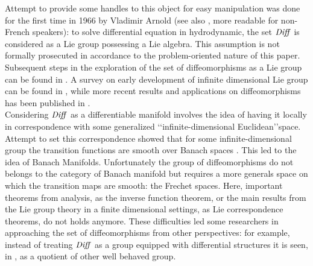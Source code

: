 Attempt to provide some handles to this object for easy manipulation was done for the first time in 1966 by Vladimir Arnold \cite{arnold1966geometrie} (see also \cite{arnold1998topological}, more readable for non-French speakers): to solve differential equation in hydrodynamic, the set $\text{\emph{Diff}}$ is considered as a Lie group possessing a Lie algebra. This assumption is not formally prosecuted in accordance to the problem-oriented nature of this paper. Subsequent steps in the exploration of the set of diffeomorphisms as a Lie group can be found in \cite{marsden1970hamiltonian, ebin1970groups, omori1970group, leslie1983lie}. A survey on early development of infinite dimensional Lie group can be found in \cite{Milnor:84:remarks}, while more recent results and applications on diffeomorphisms has been published in \cite{ovsienko1992integrals, bauer2010sobolev,schmid2010infinite,  bauer2011geodesic}.\\

Considering $\text{\emph{Diff}}$ as a differentiable manifold involves the idea of having it locally in correspondence with some generalized \lq\lq infinite-dimensional Euclidean\rq\rq\phantom{z}space. Attempt to set this correspondence showed that for some infinite-dimensional group the transition functions are smooth over Banach spaces \cite{khesin2008geometry}. This led to the idea of Banach Manifolds. Unfortunately the group of diffeomorphisms do not belongs to the category of Banach manifold but requires a more generals space on which the transition maps are smooth: the Frechet spaces. Here, important theorems from analysis, as the inverse function theorem, or the main results from the Lie group theory in a finite dimensional settings, as Lie correspondence theorems, do not holds anymore. These difficulties led some researchers in approaching the set of diffeomorphisms from other perspectives: 
for example, instead of treating $\text{\emph{Diff}}$ as a group equipped with differential structures it is seen, in \cite{wojtynski1994one}, as a quotient of other well behaved group.\\

